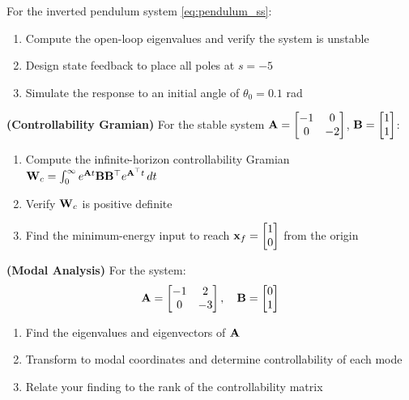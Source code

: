 \begin{exercise}
For the inverted pendulum system \eqref{eq:pendulum_ss}:
\begin{enumerate}
\item Compute the open-loop eigenvalues and verify the system is unstable
\item Design state feedback to place all poles at $s = -5$
\item Simulate the response to an initial angle of $\theta_0 = 0.1$ rad
\end{enumerate}
\end{exercise}

\begin{exercise}
\textbf{(Controllability Gramian)} For the stable system $\mathbf{A} = \begin{bmatrix} -1 & 0 \\ 0 & -2 \end{bmatrix}$, $\mathbf{B} = \begin{bmatrix} 1 \\ 1 \end{bmatrix}$:
\begin{enumerate}
\item Compute the infinite-horizon controllability Gramian $\mathbf{W}_c = \int_0^\infty e^{\mathbf{A} t}\mathbf{B}\mathbf{B}^\top e^{\mathbf{A}^\top t}\,dt$
\item Verify $\mathbf{W}_c$ is positive definite
\item Find the minimum-energy input to reach $\mathbf{x}_f = \begin{bmatrix} 1 \\ 0 \end{bmatrix}$ from the origin
\end{enumerate}
\end{exercise}

\begin{exercise}
\textbf{(Modal Analysis)} For the system:
\begin{equation}
\mathbf{A} = \begin{bmatrix} -1 & 2 \\ 0 & -3 \end{bmatrix}, \quad
\mathbf{B} = \begin{bmatrix} 0 \\ 1 \end{bmatrix}
\end{equation}
\begin{enumerate}
\item Find the eigenvalues and eigenvectors of $\mathbf{A}$
\item Transform to modal coordinates and determine controllability of each mode
\item Relate your finding to the rank of the controllability matrix
\end{enumerate}
\end{exercise}

